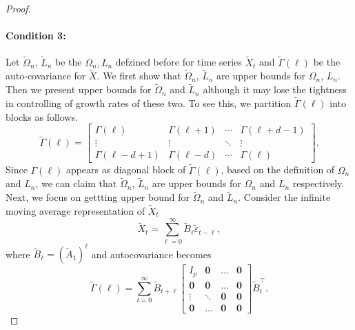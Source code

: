 \begin{proof}
\paragraph{Condition 3:} 
Let $\tilde{\Omega}_n$, $\tilde{L}_n$ be the $\Omega_n, L_n$ defzined before for time series $\tilde{X}_t$ and $\tilde{\Gamma}(\ell)$ be the auto-covariance for $\tilde{X}$. We first show that $\tilde{\Omega}_n$, $\tilde{L}_n$
are upper bounds for $\Omega_n$, $L_n$. Then we present upper bounds for $\tilde{\Omega}_n$ and $\tilde{L}_n$ although it may lose the tightness in controlling of growth rates of these two. To see this, we partition $\tilde{\Gamma}(\ell)$ into blocks as follows.
\begin{equation}
\tilde{\Gamma}(\ell) = 
\begin{bmatrix} 
\Gamma(\ell) & \Gamma(\ell+1) & \cdots & \Gamma(\ell+d-1)\\ 
\vdots & \vdots & \ddots & \vdots \\
\Gamma(\ell-d+1) & \Gamma(\ell-d) & \cdots & \Gamma(\ell)
\end{bmatrix}.\nonumber
\end{equation}
Since $\Gamma(\ell)$ appears as diagonal block of $\tilde{\Gamma}(\ell)$, based on the definition of $\Omega_n$ and $L_n$, we can claim that $\tilde{\Omega}_n$, $\tilde{L}_n$ are upper bounds for $\Omega_n$ and $L_n$ respectively. Next, we focus on gettting upper bound for $\tilde{\Omega}_n$ and $\tilde{L}_n$. 
Consider the infinite moving average representation of $\tilde{X}_t$ 
\begin{equation}
\tilde{X}_t = \sum_{\ell=0}^\infty \tilde{B}_\ell \tilde{\varepsilon}_{t-\ell}, \nonumber
\end{equation}
where $\tilde{B}_\ell = (\tilde{A}_1)^\ell$ and autocovariance becomes
\begin{equation}
\tilde{\Gamma}(\ell) = \sum_{t=0}^\infty \tilde{B}_{t+\ell} \begin{bmatrix}
I_{p} & \mathbf{0} &\ldots & \mathbf{0} \\
\mathbf{0} &  \mathbf{0} & \ldots & \mathbf{0} \\
\vdots  & \ddots  &  \mathbf{0} & \mathbf{0} \\
\mathbf{0} &\ldots   &  \mathbf{0} & \mathbf{0}
\end{bmatrix}
\tilde{B}_{t}^\top.  \nonumber
\end{equation}



\end{proof}
